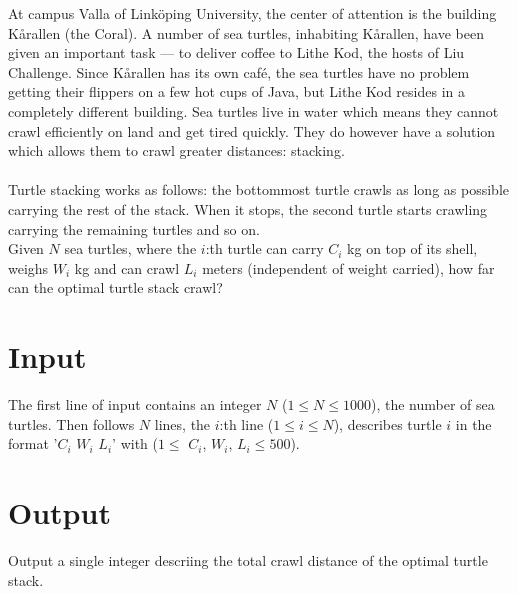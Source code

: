 

At campus Valla of Linköping University, the center of attention is the building Kårallen (the Coral). A number of sea turtles, inhabiting Kårallen, have been given an important task --- to deliver coffee to Lithe Kod, the hosts of Liu Challenge. Since Kårallen has its own café, the sea turtles have no problem getting their flippers on a few hot cups of Java, but Lithe Kod resides in a completely different building. Sea turtles live in water which means they cannot crawl efficiently on land and get tired quickly. They do however have a solution which allows them to crawl greater distances: stacking.\\
\\
Turtle stacking works as follows: the bottommost turtle crawls as long as possible carrying the rest of the stack. When it stops, the second turtle starts crawling carrying the remaining turtles and so on.
\\
Given $N$ sea turtles, where the $i$:th turtle can carry $C_i$ kg on top of its shell, weighs $W_i$ kg and can crawl $L_i$ meters (independent of weight carried), how far can the optimal turtle stack crawl?\\

\section*{Input}
The first line of input contains an integer $N$ ($1 \leq N \leq 1000$), the number of sea turtles. Then follows $N$ lines, the $i$:th line ($1 \leq i \leq N$), describes turtle $i$ in the format '$C_i$ $W_i$ $L_i$' with ($1 \leq$ $C_i$, $W_i$, $L_i \leq 500$).

\section*{Output}
Output a single integer descriing the total crawl distance of the optimal turtle stack.

